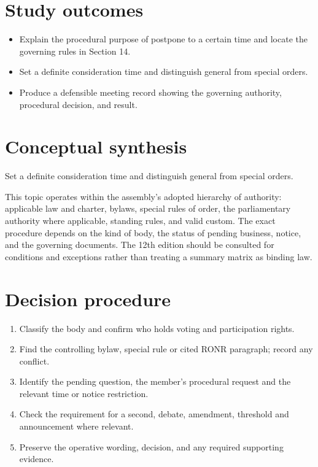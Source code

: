 \documentclass[11pt]{article}
\begin{document}
\SuiteOpen
{}
\section{Study outcomes}
\begin{itemize}[leftmargin=*,itemsep=4pt]
\item Explain the procedural purpose of postpone to a certain time and locate the governing rules in Section 14.
\item Set a definite consideration time and distinguish general from special orders.
\item Produce a defensible meeting record showing the governing authority, procedural decision, and result.
\end{itemize}

\section{Conceptual synthesis}
Set a definite consideration time and distinguish general from special orders.

This topic operates within the assembly’s adopted hierarchy of authority: applicable law and charter, bylaws, special rules of order, the parliamentary authority where applicable, standing rules, and valid custom. The exact procedure depends on the kind of body, the status of pending business, notice, and the governing documents. The 12th edition should be consulted for conditions and exceptions rather than treating a summary matrix as binding law.
\section{Decision procedure}
\begin{enumerate}[leftmargin=*,itemsep=4pt]
\item Classify the body and confirm who holds voting and participation rights.
\item Find the controlling bylaw, special rule or cited RONR paragraph; record any conflict.
\item Identify the pending question, the member’s procedural request and the relevant time or notice restriction.
\item Check the requirement for a second, debate, amendment, threshold and announcement where relevant.
\item Preserve the operative wording, decision, and any required supporting evidence.
\end{enumerate}
\end{document}
